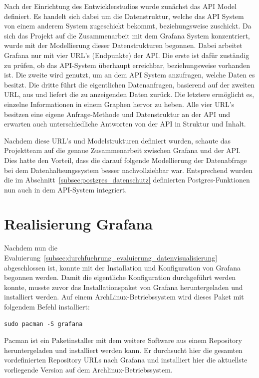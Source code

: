 Nach der Einrichtung des Entwicklerstudios wurde zunächst das API Model
definiert. Es handelt sich dabei um die Datenstruktur, welche das API System
von einem anderem System zugeschickt bekommt, beziehungsweise zuschickt. Da
sich das Projekt auf die Zusammenarbeit mit dem Grafana System konzentriert,
wurde mit der Modellierung dieser Datenstrukturen begonnen. Dabei arbeitet
Grafana nur mit vier URL's (Endpunkte) der API\@. Die erste ist dafür zuständig
zu prüfen, ob das API-System überhaupt erreichbar, beziehungsweise vorhanden
ist. Die zweite wird genutzt, um an dem API System anzufragen, welche Daten es
besitzt. Die dritte führt die eigentlichen Datenanfragen, basierend auf der
zweiten URL, aus und liefert die zu anzeigenden Daten zurück. Die letztere
ermöglicht es, einzelne Informationen in einem Graphen hervor zu heben. Alle
vier URL's besitzen eine eigene Anfrage-Methode und Datenstruktur an der API
und erwarten auch unterschiedliche Antworten von der API in Struktur und
Inhalt.

Nachdem diese URL's und Modelstrukturen definiert wurden, schaute das
Projektteam auf die genaue Zusammenarbeit zwischen Grafana und der API\@. Dies
hatte den Vorteil, dass die darauf folgende Modellierung der Datenabfrage bei
dem Datenhaltsungssystem besser nachvollziehbar war. Entsprechend wurden die im
Abschnitt~\ref{subsec:postgres_datenschutz} definierten Postgres-Funktionen nun
auch in dem API-System integriert.
\nl%

\section{Realisierung Grafana}
\label{sec:realisierung_grafana}
Nachdem nun die
Evaluierung~\ref{subsec:durchfuehrung_evaluierung_datenvisualisierung}
abgeschlossen ist, konnte mit der Installation und Konfiguration von Grafana
begonnen werden. Damit die eigentliche Konfiguration durchgeführt werden
konnte, musste zuvor das Installationspaket von Grafana heruntergeladen und
installiert werden. Auf einem ArchLinux-Betriebssystem wird dieses Paket mit
folgendem Befehl installiert:

\begin{verbatim}
sudo pacman -S grafana
\end{verbatim}

Pacman ist ein Paketinstaller mit dem weitere Software aus einem Repository
heruntergeladen und installiert werden kann. Er durchsucht hier die gesamten
vordefinierten Repository URLs nach Grafana und installiert hier die aktuellste
vorliegende Version auf dem Archlinux-Betriebssystem.

